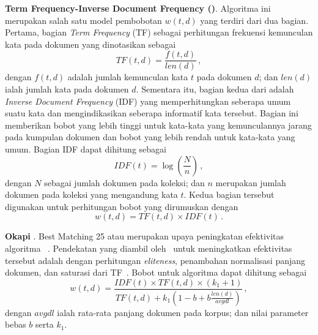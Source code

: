 \vspace{2mm}
\noindent\textbf{Term Frequency-Inverse Document Frequency (\tfidf{})}. Algoritma ini merupakan salah satu model pembobotan \(w(t,d)\) yang terdiri dari dua bagian. Pertama, bagian \textit{Term Frequency} (TF) sebagai perhitungan frekuensi kemunculan kata pada dokumen yang dinotasikan sebagai
\[
TF(t,d)=\frac{f(t,d)}{len(d)} \, ,
\]
dengan \(f(t,d)\) adalah jumlah kemunculan kata $t$ pada dokumen $d$; dan $len(d)$ ialah jumlah kata pada dokumen $d$. Sementara itu, bagian kedua dari \tfidf{} adalah \textit{Inverse Document Frequency} (IDF) yang memperhitungkan seberapa umum suatu kata dan mengindikasikan seberapa informatif kata tersebut. Bagian ini memberikan bobot yang lebih tinggi untuk kata-kata yang kemunculannya jarang pada kumpulan dokumen dan bobot yang lebih rendah untuk kata-kata yang umum. Bagian IDF dapat dihitung sebagai
\[
IDF(t)= \log\left(\frac{N}{n}\right) \, ,
\]
dengan $N$ sebagai jumlah dokumen pada koleksi; dan $n$ merupakan jumlah dokumen pada koleksi yang mengandung kata $t$. Kedua bagian tersebut digunakan untuk perhitungan bobot \tfidf{} yang dirumuskan dengan
\[ 
w(t,d)=TF(t,d) \times IDF(t) \, . 
\]

\vspace{2mm}
\noindent\textbf{Okapi \obm{}}. Best Matching 25 atau \obm{} merupakan upaya peningkatan efektivitas algoritma \tfidf{}~\citep{schutze2008introduction}. Pendekatan yang diambil oleh~\citet{robertson1995okapi} untuk meningkatkan efektivitas tersebut adalah dengan perhitungan \textit{eliteness}, penambahan normalisasi panjang dokumen, dan saturasi dari TF~\citep{Robertson2009ThePR}. Bobot untuk algoritma \obm{} dapat dihitung sebagai
\[
w(t,d)=\frac{IDF(t) \times TF(t,d) \times (k_1 + 1)}{TF(t,d) + k_1 (1 - b + b \frac{len(d)}{avgdl})} \, ,
\]
dengan $avgdl$ ialah rata-rata panjang dokumen pada korpus; dan nilai parameter bebas $b$ serta $k_1$.

